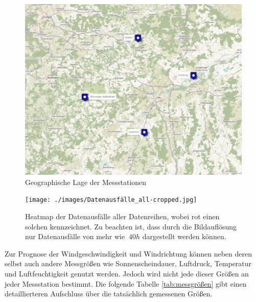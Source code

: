 \documentclass[
12pt, %
toc=listofnumbered, %
toc=chapterentrydotfill, %
numbers=noenddot, %
captions=tableheading, %
bibliography=numbered
]{scrreprt}
\begin{document}
\begin{figure}[tph]
	\begin{center}
		\includegraphics[width=\textwidth]{./images/map.png}
		\caption{Geographische Lage der Messstationen \cite{2021_OpenStreetMap-Contributors_UMap}}
		\label{fig:map}
	\end{center}
\end{figure}

\begin{figure}[tph]
	\begin{center}
		\texttt{[image: ./images/Datenausfälle\_all-cropped.jpg]}
		\caption{Heatmap der Datenausfälle aller Datenreihen, wobei rot einen solchen kennzeichnet. Zu beachten ist, dass durch die Bildauflösung nur Datenausfälle von mehr wie $~40h$ dargestellt werden können.}
		\label{fig:heatmap}
	\end{center}
\end{figure}

Zur Prognose der Windgeschwindigkeit und Windrichtung können neben deren selbst auch andere Messgrößen wie Sonnenscheindauer, Luftdruck, Temperatur und Luftfeuchtigkeit genutzt werden. Jedoch wird nicht jede dieser Größen an jeder Messstation bestimmt. Die folgende Tabelle \ref{tab:messgrößen} gibt einen detaillierteren Aufschluss über die tatsächlich gemessenen Größen.
\end{document}
